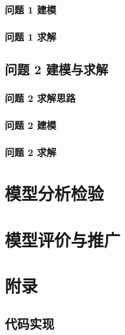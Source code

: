 \documentclass{article}
\begin{document}
\subsubsection{问题 1 建模}\label{subsubsec:problem1_model}

\subsubsection{问题 1 求解}\label{subsubsec:problem1_solve}

\subsection{问题 2 建模与求解}\label{subsec:problem2}

\subsubsection{问题 2 求解思路}\label{subsubsec:problem2_idea}

\subsubsection{问题 2 建模}\label{subsubsec:problem2_model}

\subsubsection{问题 2 求解}\label{subsubsec:problem2_solve}

\section{模型分析检验}\label{sec:analysis_check}

\section{模型评价与推广}\label{sec:evaluation}

\section{附录}\label{sec:appendix}

\subsection{代码实现}\label{subsec:code}

\end{document}
